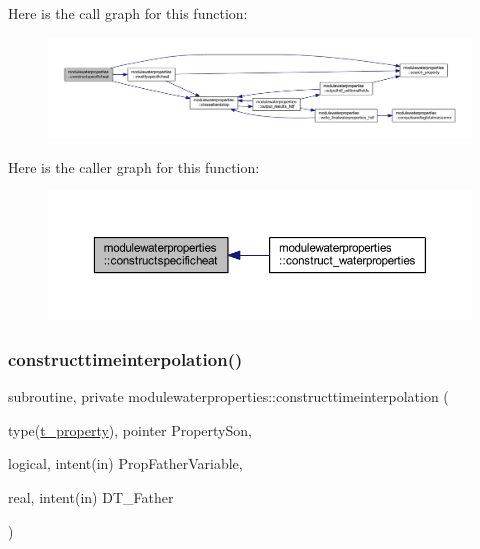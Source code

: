 Here is the call graph for this function\+:\nopagebreak
\begin{figure}[H]
\begin{center}
\leavevmode
\includegraphics[width=350pt]{namespacemodulewaterproperties_a638275f2c0c184e858bd3e3e3e459901_cgraph}
\end{center}
\end{figure}
Here is the caller graph for this function\+:\nopagebreak
\begin{figure}[H]
\begin{center}
\leavevmode
\includegraphics[width=350pt]{namespacemodulewaterproperties_a638275f2c0c184e858bd3e3e3e459901_icgraph}
\end{center}
\end{figure}
\mbox{\label{namespacemodulewaterproperties_affcb95213dcebf7b3e1fe53b349d50b6}} 
\subsubsection{\texorpdfstring{constructtimeinterpolation()}{constructtimeinterpolation()}}
{\footnotesize\ttfamily subroutine, private modulewaterproperties\+::constructtimeinterpolation (\begin{DoxyParamCaption}\item[{type(\mbox{\hyperlink{structmodulewaterproperties_1_1t__property}{t\+\_\+property}}), pointer}]{Property\+Son,  }\item[{logical, intent(in)}]{Prop\+Father\+Variable,  }\item[{real, intent(in)}]{D\+T\+\_\+\+Father }\end{DoxyParamCaption})\hspace{0.3cm}{\ttfamily [private]}}

